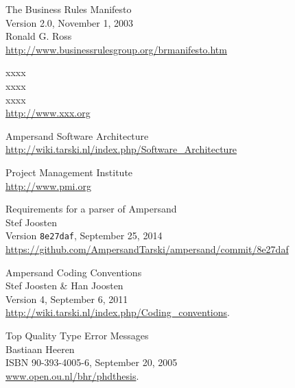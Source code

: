 \label{sec:bibliography}

\begin{thebibliography}{99}

	The Business Rules Manifesto\\
	Version 2.0, November 1, 2003\\
	Ronald G. Ross\\
	\url{http://www.businessrulesgroup.org/brmanifesto.htm}
	
	xxxx\\
	xxxx\\
	xxxx\\
	\url{http://www.xxx.org}
	
	Ampersand Software Architecture\\
	\url{http://wiki.tarski.nl/index.php/Software_Architecture}
	
	Project Management Institute\\
	\url{http://www.pmi.org}
	
	Requirements for a parser of Ampersand\\
	Stef Joosten\\
	Version \texttt{8e27daf}, September 25, 2014\\
	\url{https://github.com/AmpersandTarski/ampersand/commit/8e27daf}
	
	Ampersand Coding Conventions\\
	Stef Joosten \& Han Joosten\\
	Version 4, September 6, 2011\\
	\url{http://wiki.tarski.nl/index.php/Coding\_conventions}.

	Top Quality Type Error Messages\\
	Bastiaan Heeren\\
	ISBN 90-393-4005-6, September 20, 2005\\
	\url{www.open.ou.nl/bhr/phdthesis}.

\end{thebibliography}